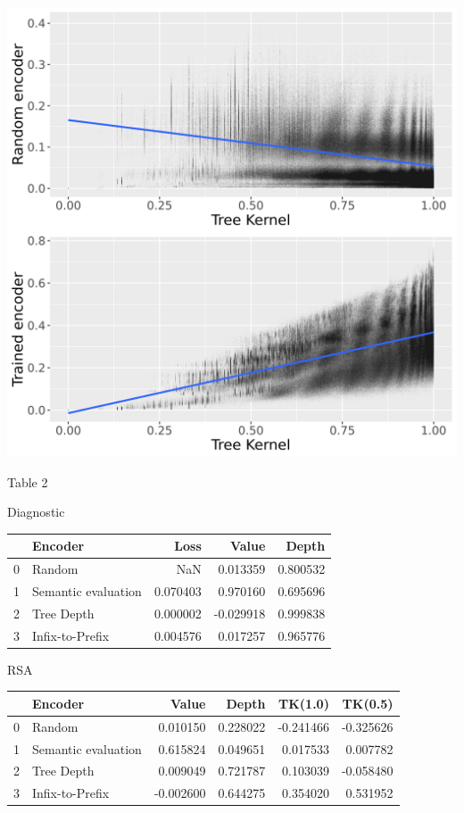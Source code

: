 \includegraphics[scale=0.3]{scatter_rsa.png}

Table 2 \label{tab:results_main}

Diagnostic

\begin{tabular}{llrrr}
\toprule
{} &              Encoder &      Loss &     Value &     Depth \\
\midrule
0 &               Random &       NaN &  0.013359 &  0.800532 \\
1 &  Semantic evaluation &  0.070403 &  0.970160 &  0.695696 \\
2 &           Tree Depth &  0.000002 & -0.029918 &  0.999838 \\
3 &      Infix-to-Prefix &  0.004576 &  0.017257 &  0.965776 \\
\bottomrule
\end{tabular}

RSA

\begin{tabular}{llrrrr}
\toprule
{} &              Encoder &     Value &     Depth &   TK(1.0) &   TK(0.5) \\
\midrule
0 &               Random &  0.010150 &  0.228022 & -0.241466 & -0.325626 \\
1 &  Semantic evaluation &  0.615824 &  0.049651 &  0.017533 &  0.007782 \\
2 &           Tree Depth &  0.009049 &  0.721787 &  0.103039 & -0.058480 \\
3 &      Infix-to-Prefix & -0.002600 &  0.644275 &  0.354020 &  0.531952 \\
\bottomrule
\end{tabular}

